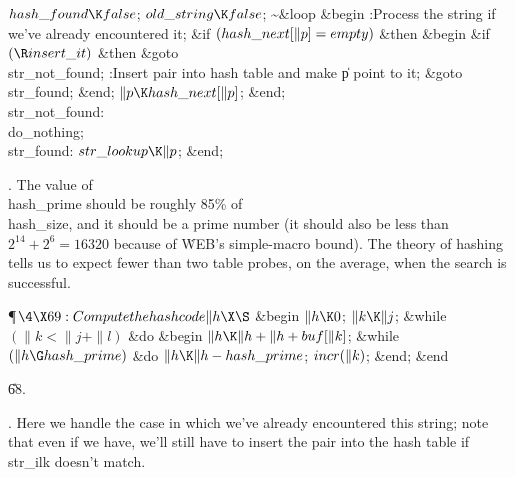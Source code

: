 $\\{hash\_found}\K\\{false}$;\5
$\\{old\_string}\K\\{false}$;\6
\~ \1\&{loop}\6
\&{begin} :Process the string if we've already encountered it\X;\6
\&{if} $(\\{hash\_next}[\|p]=\\{empty})$ \1\&{then}\6
\&{begin} \&{if} $(\R\\{insert\_it})$ \1\&{then}\5
\&{goto} \\{str\_not\_found};\2\6
:Insert pair into hash table and make \|p point to it\X;\6
\&{goto} \\{str\_found};\6
\&{end};\2\6
$\|p\K\\{hash\_next}[\|p]$;\6
\&{end};\2\6
\4\\{str\_not\_found}: \\{do\_nothing};\6
\4\\{str\_found}: $\\{str\_lookup}\K\|p$;\6
\&{end};\par
\fi

.
The value of \\{hash\_prime} should be roughly 85\% of \\{hash\_size}, and
it should be a prime number
(it should also be less than $2^{14} + 2^{6} = 16320$ because of
\.{WEB}'s simple-macro bound).  The theory of hashing tells us to expect
fewer than two table probes, on the average, when the search is
successful.

\Y\P$\4\X69:Compute the hash code \|h\X\S$\6
\&{begin} $\|h\K0$;\6
$\|k\K\|j$;\6
\&{while} $(\|k<\|j+\|l)$ \1\&{do}\6
\&{begin} $\|h\K\|h+\|h+\\{buf}[\|k]$;\6
\&{while} $(\|h\G\\{hash\_prime})$ \1\&{do}\5
$\|h\K\|h-\\{hash\_prime}$;\2\6
$\\{incr}(\|k)$;\6
\&{end};\2\6
\&{end}\par
\U68.\fi

.
Here we handle the case in which we've already encountered this
string; note that even if we have, we'll still have to insert the pair
into the hash table if \\{str\_ilk} doesn't match.

